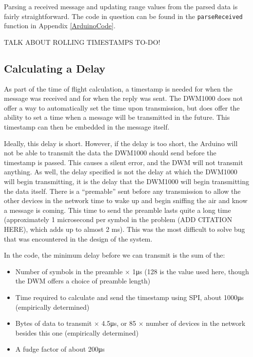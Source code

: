 Parsing a received message and updating range values from the parsed data is fairly straightforward. The code in question can be found in the \texttt{parseReceived} function in Appendix \ref{ArduinoCode}.

TALK ABOUT ROLLING TIMESTAMPS TO-DO!

\subsection{Calculating a Delay}
As part of the time of flight calculation, a timestamp is needed for when the message was received and for when the reply was sent. The DWM1000 does not offer a way to automatically set the time upon transmission, but does offer the ability to set a time when a message will be transmitted in the future. This timestamp can then be embedded in the message itself.

Ideally, this delay is short. However, if the delay is too short, the Arduino will not be able to transmit the data the DWM1000 should send before the timestamp is passed. This causes a silent error, and the DWM will not transmit anything. As well, the delay specified is not the delay at which the DWM1000 will begin transmitting, it is the delay that the DWM1000 will begin transmitting the data itself. There is a ``premable'' sent before any transmission to allow the other devices in the network time to wake up and begin sniffing the air and know a message is coming. This time to send the preamble lasts quite a long time (approximately 1 microsecond per symbol in the problem (ADD CITATION HERE), which adds up to almost 2 ms). This was the most difficult to solve bug that was encountered in the design of the system.

In the code, the minimum delay before we can transmit is the sum of the:
\begin{itemize}
	\item Number of symbols in the preamble $\times$ 1\si{\micro\second} (128 is the value used here, though the DWM offers a choice of preamble length)
	\item Time required to calculate and send the timestamp using SPI, about 1000\si{\micro\second} (empirically determined)
	\item Bytes of data to transmit $\times$ 4.5\si{\micro\second}, or 85 $\times$ number of devices in the network besides this one (empirically determined)
	\item A fudge factor of about 200\si{\micro\second}
\end{itemize}

